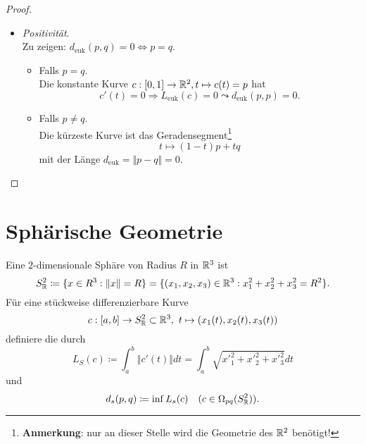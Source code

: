 \begin{theorem}
\begin{proof}
\begin{itemize}
      \item \emph{Positivität}. \\
        Zu zeigen: $ d_\text{euk}(p,q) = 0 \Leftrightarrow p = q $.
        \begin{itemize}
          \item Falls $ p = q $. \\
            Die konstante Kurve $ c: [0,1] \to \mathbb{R}^2, t \mapsto c(t) = p $ hat 
            \begin{equation*}
              c'(t) = 0 \Rightarrow L_\text{euk}(c) = 0 \leadsto d_\text{euk}(p,p) = 0 \text{.}
            \end{equation*}
          \item Falls $ p \neq q $. \\
            Die kürzeste Kurve ist das Geradensegment\footnote{\textbf{Anmerkung}: nur an dieser Stelle wird die Geometrie des $ \mathbb{R}^2 $ benötigt!}
            \begin{equation*}
              t \mapsto (1-t)p + tq
            \end{equation*}
            mit der Länge $ d_\text{euk} = \Vert p - q \Vert = 0 $.
        \end{itemize}
    \end{itemize}
  \end{proof}
\end{theorem}

\section{Sphärische Geometrie}
\begin{example}
  Eine $ 2 $-dimensionale Sphäre von Radius $ R $ in $ \mathbb{R}^3 $ ist
  \begin{equation*}
    S^2_{\mathbb{R}} \coloneqq \{ x \in R^3 : \Vert x \Vert = R \} = \{ (x_1, x_2, x_3) \in \mathbb{R}^3 : x_1^2+x_2^2+x_3^2 = R^2 \}\text{.}
  \end{equation*}
  Für eine stückweise differenzierbare Kurve
  \begin{equation*}
    c: [a,b] \to S^2_{\mathbb{R}} \subset \mathbb{R}^3, \ t \mapsto (x_1(t), x_2(t), x_3(t))
  \end{equation*}
  definiere die  durch
  \begin{equation*}
    L_S(c) \coloneqq \int_a^b \Vert c'(t) \Vert dt = \int_a^b \sqrt{{x'}_1^2+{x'}_2^2+{x'}_3^2}dt
  \end{equation*}
  und
  \begin{equation*}
    d_s(p,q) \coloneqq \inf L_s(c) \quad (c \in \Omega_{pq}(S^2_{\mathbb{R}}))\text{.}
  \end{equation*}
\end{example}

